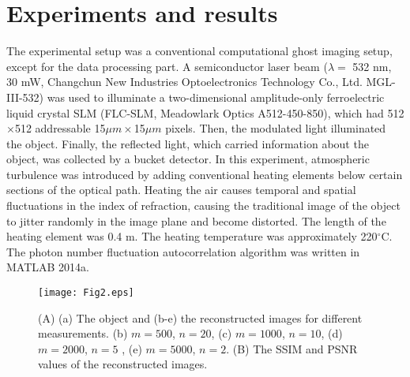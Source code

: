 \documentclass[letterpaper,10pt]{article}
\begin{document}
\section{Experiments and results}

The experimental setup was a conventional computational ghost imaging setup,
except for the data processing part. A semiconductor laser beam ($\lambda=$%
532 nm, 30 mW, Changchun New Industries Optoelectronics Technology Co., Ltd.
MGL-III-532) was used to illuminate a two-dimensional amplitude-only
ferroelectric liquid crystal SLM (FLC-SLM, Meadowlark Optics A512-450-850),
which had 512$\times$512 addressable 15$\mu m\times$15$\mu m$ pixels. Then,
the modulated light illuminated the object. Finally, the reflected light,
which carried information about the object, was collected by a bucket
detector. In this experiment, atmospheric turbulence was introduced by
adding conventional heating elements below certain sections of the optical
path. Heating the air causes temporal and spatial fluctuations in the index
of refraction, causing the traditional image of the object to jitter
randomly in the image plane and become distorted. The length of the heating
element was 0.4 m. The heating temperature was approximately 220$^{\circ}$C.
The photon number fluctuation autocorrelation algorithm was written in
MATLAB 2014a.
\begin{figure}[ptbh]
\centering\texttt{[image: Fig2.eps]}
\caption{(A) (a) The object and (b-e) the reconstructed images for different
measurements. (b) $m=500$, $n=20$, (c) $m=1000$, $n=10$, (d) $m=2000$, $n=5$%
, (e) $m=5000$, $n=2$. (B) The SSIM and PSNR values of the reconstructed
images.}
\end{figure}
\end{document}
